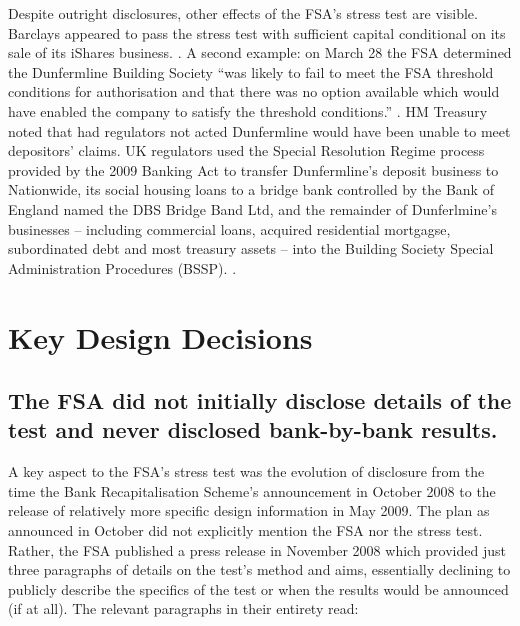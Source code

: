 \documentclass[12pt]{article}
\begin{document}
Despite outright disclosures, other effects of the FSA's stress test are visible. Barclays appeared to pass the stress test with sufficient capital conditional on its sale of its iShares business. \citep{Barclays1}. A second example: on March 28 the FSA determined the Dunfermline Building Society ``was likely to fail to meet the FSA threshold conditions for authorisation and that there was no option available which would have enabled the company to satisfy the threshold conditions.'' \citep{DunferlminePress}. HM Treasury noted that had regulators not acted Dunfermline would have been unable to meet depositors' claims. UK regulators used the Special Resolution Regime process provided by the 2009 Banking Act to transfer Dunfermline's deposit business to Nationwide, its social housing loans to a bridge bank controlled by the Bank of England named the DBS Bridge Band Ltd, and the remainder of Dunferlmine's businesses -- including commercial loans, acquired residential mortgagse, subordinated debt and most treasury assets -- into the Building Society Special Administration Procedures (BSSP). \citep{DunferlminePress}.

\section{Key Design Decisions}\label{keydesign}

\subsection{The FSA did not initially disclose details of the test and never disclosed bank-by-bank results.}

A key aspect to the FSA's stress test was the evolution of disclosure from the time the Bank Recapitalisation Scheme's announcement in October 2008 to the release of relatively more specific design information in May 2009. The plan as announced in October did not explicitly mention the FSA nor the stress test. Rather, the FSA published a press release in November 2008 which provided just three paragraphs of details on the test's method and aims, essentially declining to publicly describe the specifics of the test or when the results would be announced (if at all). The relevant paragraphs in their entirety read:
\end{document}
